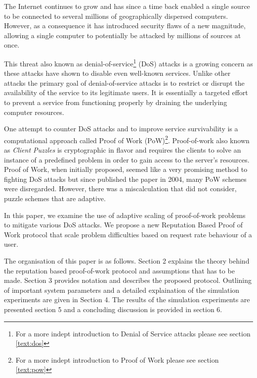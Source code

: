 The Internet continues to grow and has since a time back enabled a single source to be connected to several millions of geographically dispersed computers. However, as a consequence it has introduced security flaws of a new magnitude, allowing a single computer to potentially be attacked by millions of sources at once. 

This threat also known as denial-of-service\footnote{For a more indept introduction to Denial of Service attacks please see section \ref{text:dos}} (DoS) attacks is a growing concern as these attacks have shown to disable even well-known services. Unlike other attacks the primary goal of denial-of-service attacks is to restrict or disrupt the availability of the service to its legitimate users. It is essentially a targeted effort to prevent a service from functioning properly by draining the underlying computer resources. 

One attempt to counter DoS attacks and to improve service survivability is a computational approach called Proof of Work (PoW)\footnote{For a more indept introduction to Proof of Work please see section \ref{text:pow}}. Proof-of-work also known as \emph{Client Puzzles}\cite{dosauth, JuelsB99} is cryptographic in flavor and requires the clients to solve an instance of a predefined problem in order to gain access to the server’s resources. Proof of Work, when initially proposed, seemed like a very promising method to fighting DoS attacks but since \citeauthor{LaurieC04} published the paper  in 2004, many PoW schemes were disregarded. However, there was a miscalculation that \citeauthor{LaurieC04} did not consider, puzzle schemes that are adaptive\cite{Green,gunter}.

In this paper, we examine the use of adaptive scaling of proof-of-work problems to mitigate various DoS attacks. We propose a new Reputation Based Proof of Work protocol that scale problem difficulties based on request rate behaviour of a user.

The organisation of this paper is as follows. Section 2 explains the theory behind the reputation based proof-of-work protocol and assumptions that has to be made. Section 3 provides notation and describes the proposed protocol. Outlining of important system parameters and a detailed explaination of the simulation experiments are given in Section 4. The results of the simulation experiments are presented section 5 and a concluding discussion is provided in section 6.



